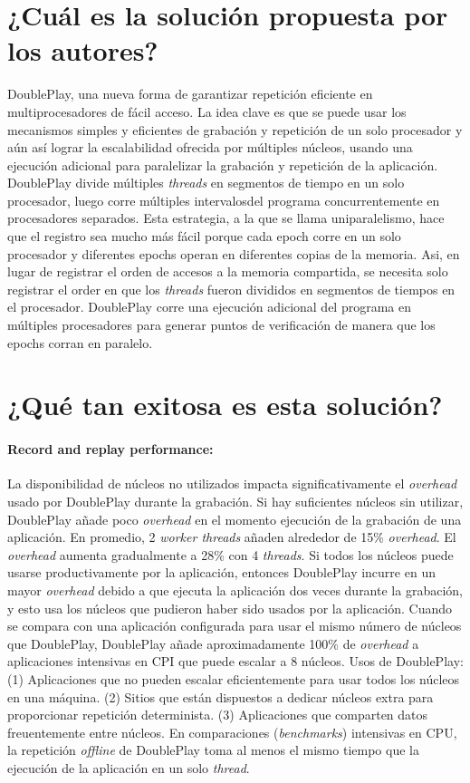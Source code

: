 \section{¿Cuál es la solución propuesta por los autores?}
DoublePlay, una nueva forma de garantizar repetición eficiente en multiprocesadores de fácil acceso. La idea clave es que se puede usar los mecanismos simples y eficientes de grabación y repetición de un solo procesador y aún así lograr la escalabilidad ofrecida por múltiples núcleos, usando una ejecución adicional para paralelizar la grabación y repetición de la aplicación. DoublePlay divide múltiples \emph{threads} en segmentos de tiempo en un solo procesador, luego corre múltiples intervalosdel programa concurrentemente en procesadores separados. Esta estrategia, a la que se llama uniparalelismo, hace que el registro sea mucho más fácil porque cada epoch corre en un solo procesador y diferentes epochs operan en diferentes copias de la memoria. Asi, en lugar de registrar el orden de accesos a la memoria compartida, se necesita solo registrar el order en que los \emph{threads} fueron divididos en segmentos de tiempos en el procesador. DoublePlay corre una ejecución adicional del programa en múltiples procesadores para generar puntos de verificación de manera que los epochs corran en paralelo. 

\section{¿Qué tan exitosa es esta solución?} 
\paragraph{Record and replay performance:} La disponibilidad de núcleos no utilizados impacta significativamente el \emph{overhead} usado por DoublePlay durante la grabación. Si hay suficientes núcleos sin utilizar, DoublePlay añade poco \emph{overhead} en el momento ejecución de la grabación de una aplicación. En promedio, 2 \emph{worker threads} añaden alrededor de 15\% \emph{overhead}. El \emph{overhead} aumenta gradualmente a 28\% con 4 \emph{threads}. Si todos los núcleos puede usarse productivamente por la aplicación, entonces DoublePlay incurre en un mayor \emph{overhead} debido a que ejecuta la aplicación dos veces durante la grabación, y esto usa los núcleos que pudieron haber sido usados por la aplicación. Cuando se compara con una aplicación configurada para usar el mismo número de núcleos que DoublePlay, DoublePlay añade aproximadamente 100\% de \emph{overhead} a aplicaciones intensivas en CPI que puede escalar a 8 núcleos. Usos de DoublePlay: (1) Aplicaciones que no pueden escalar eficientemente para usar todos los núcleos en una máquina. (2) Sitios que están dispuestos a dedicar núcleos extra para proporcionar repetición determinista. (3) Aplicaciones que comparten datos freuentemente entre núcleos. En comparaciones (\emph{benchmarks}) intensivas en CPU, la repetición \emph{offline} de DoublePlay toma al menos el mismo tiempo que la ejecución de la aplicación en un solo \emph{thread}. 

